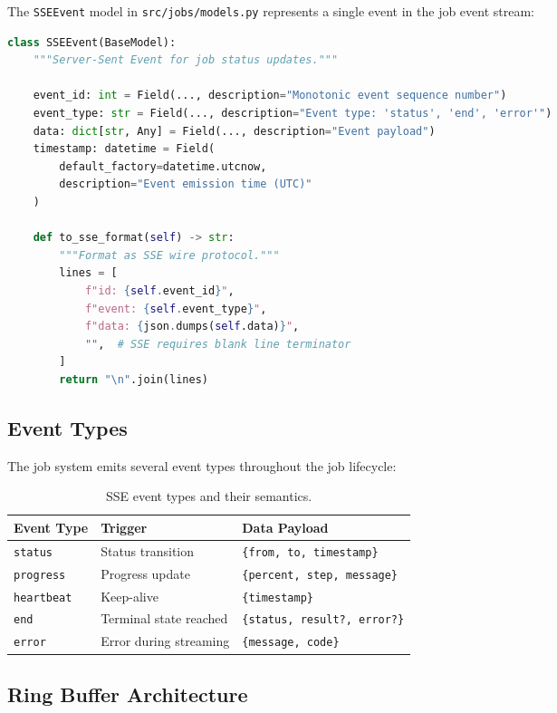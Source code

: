 The \texttt{SSEEvent} model in \texttt{src/jobs/models.py} represents a single event in the job event stream:

\begin{lstlisting}[language=Python, caption={SSEEvent model definition.}]
class SSEEvent(BaseModel):
    """Server-Sent Event for job status updates."""

    event_id: int = Field(..., description="Monotonic event sequence number")
    event_type: str = Field(..., description="Event type: 'status', 'end', 'error'")
    data: dict[str, Any] = Field(..., description="Event payload")
    timestamp: datetime = Field(
        default_factory=datetime.utcnow,
        description="Event emission time (UTC)"
    )

    def to_sse_format(self) -> str:
        """Format as SSE wire protocol."""
        lines = [
            f"id: {self.event_id}",
            f"event: {self.event_type}",
            f"data: {json.dumps(self.data)}",
            "",  # SSE requires blank line terminator
        ]
        return "\n".join(lines)
\end{lstlisting}

\subsection{Event Types}

The job system emits several event types throughout the job lifecycle:

\begin{table}[ht]
\centering
\caption{SSE event types and their semantics.}
\label{tab:sse-event-types}
\small
\begin{tabular}{llp{6cm}}
\hline
\textbf{Event Type} & \textbf{Trigger} & \textbf{Data Payload} \\
\hline
\texttt{status} & Status transition & \texttt{\{from, to, timestamp\}} \\
\texttt{progress} & Progress update & \texttt{\{percent, step, message\}} \\
\texttt{heartbeat} & Keep-alive & \texttt{\{timestamp\}} \\
\texttt{end} & Terminal state reached & \texttt{\{status, result?, error?\}} \\
\texttt{error} & Error during streaming & \texttt{\{message, code\}} \\
\hline
\end{tabular}
\end{table}

\subsection{Ring Buffer Architecture}

